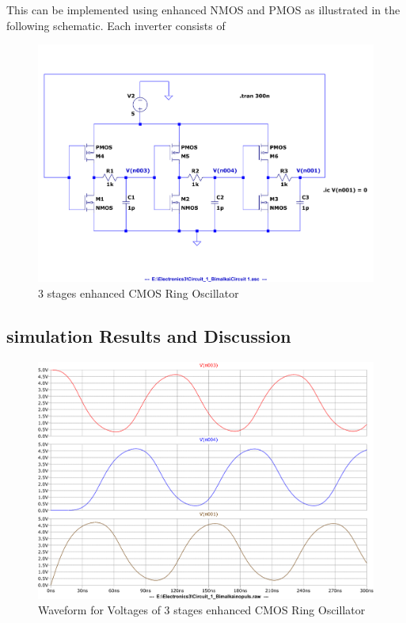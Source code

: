 \documentclass[a4paper,11pt]{article}%
\begin{document}
This can be implemented using enhanced NMOS and PMOS as illustrated in the following schematic. Each inverter consists of   

\begin{figure}[H]
\centering
\includegraphics[scale=0.6]{figures/cct1plot2}
\caption{3 stages enhanced CMOS Ring Oscillator}
\end{figure}

\subsection{simulation Results and Discussion}

\begin{figure}[H]
	\centering
	\includegraphics[scale=0.5]{figures/cct1plot1}
	\caption{Waveform for Voltages of 3 stages enhanced CMOS Ring Oscillator}
\end{figure}
\end{document}

